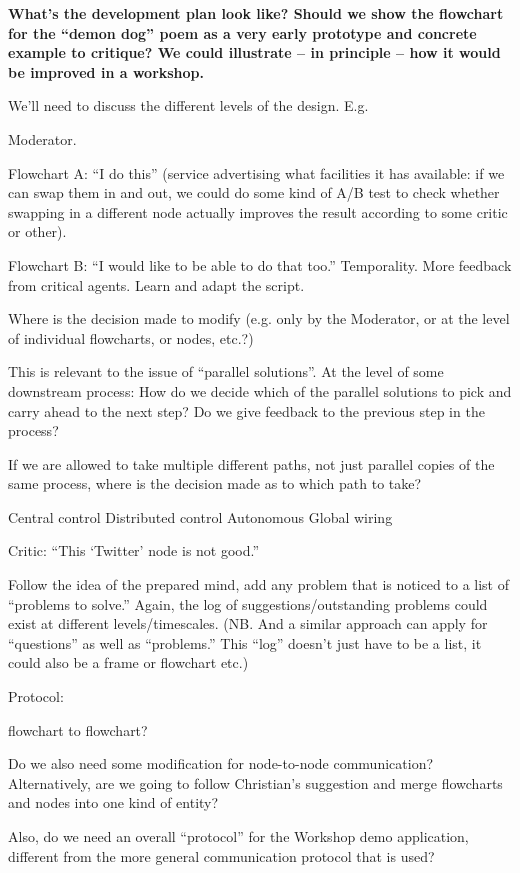\begin{mdframed}
\textbf{What's the development plan look like?  Should we show the
  flowchart for the ``demon dog'' poem as a very early prototype and
  concrete example to critique?  We could illustrate -- in principle
  -- how it would be improved in a workshop.}

We'll need to discuss the different levels of the design.  E.g.

Moderator.  

Flowchart A: ``I do this'' (service advertising what facilities it has available: if we can swap them in and out, we could do some kind of A/B test to check whether swapping in a different node actually improves the result according to some critic or other).

Flowchart B: ``I would like to be able to do that too.''
Temporality. More feedback from critical agents.  Learn and adapt the script.

Where is the decision made to modify (e.g. only by the Moderator, or at the level of individual flowcharts, or nodes, etc.?)

This is relevant to the issue of ``parallel solutions''.  At the level of some downstream process: How do we decide which of the parallel solutions to pick and carry ahead to the next step?  Do we give feedback to the previous step in the process?

If we are allowed to take multiple different paths, not just parallel copies of the same process, where is the decision made as to which path to take?

Central control
Distributed control
Autonomous
Global wiring

Critic: ``This `Twitter' node is not good.''

Follow the idea of the prepared mind, add any problem that is noticed to a list of ``problems to solve.''  Again, the log of suggestions/outstanding problems could exist at different levels/timescales.  (NB. And a similar approach can apply for ``questions'' as well as ``problems.''  This ``log'' doesn't just have to be a list, it could also be a frame or flowchart etc.)

Protocol:

flowchart to flowchart?

Do we also need some modification for node-to-node communication?
Alternatively, are we going to follow Christian's suggestion and merge flowcharts and nodes into one kind of entity?

Also, do we need an overall ``protocol'' for the Workshop demo
application, different from the more general communication protocol
that is used?


\end{mdframed}
